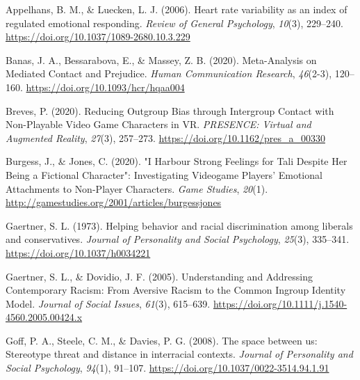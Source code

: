 \documentclass[
  english,
  man, noextraspace,floatsintext]{apa6}
\newlength{\cslhangindent}
\newlength{\cslentryspacingunit} %
\newenvironment{CSLReferences}[2] %
 {%
  \setlength{\parindent}{0pt}
  \ifodd #1
  \let\oldpar\par
  \def\par{\hangindent=\cslhangindent\oldpar}
  \fi
  \setlength{\parskip}{#2\cslentryspacingunit}
 }%
 {}
\begin{document}
\hypertarget{refs}{}
\begin{CSLReferences}{1}{0}
\leavevmode{}%
Appelhans, B. M., \& Luecken, L. J. (2006). Heart rate variability as an index of regulated emotional responding. \emph{Review of General Psychology}, \emph{10}(3), 229--240. \url{https://doi.org/10.1037/1089-2680.10.3.229}

\leavevmode{}%
Banas, J. A., Bessarabova, E., \& Massey, Z. B. (2020). Meta-{Analysis} on {Mediated Contact} and {Prejudice}. \emph{Human Communication Research}, \emph{46}(2-3), 120--160. \url{https://doi.org/10.1093/hcr/hqaa004}

\leavevmode{}%
Breves, P. (2020). Reducing {Outgroup Bias} through {Intergroup Contact} with {Non}-{Playable Video Game Characters} in {VR}. \emph{PRESENCE: Virtual and Augmented Reality}, \emph{27}(3), 257--273. \url{https://doi.org/10.1162/pres_a_00330}

\leavevmode{}%
Burgess, J., \& Jones, C. (2020). {"}{I Harbour Strong Feelings} for {Tali Despite Her Being} a {Fictional Character}{"}: {Investigating Videogame Players}' {Emotional Attachments} to {Non}-{Player Characters}. \emph{Game Studies}, \emph{20}(1). \url{http://gamestudies.org/2001/articles/burgessjones}

\leavevmode{}%
Gaertner, S. L. (1973). Helping behavior and racial discrimination among liberals and conservatives. \emph{Journal of Personality and Social Psychology}, \emph{25}(3), 335--341. \url{https://doi.org/10.1037/h0034221}

\leavevmode{}%
Gaertner, S. L., \& Dovidio, J. F. (2005). Understanding and {Addressing Contemporary Racism}: {From Aversive Racism} to the {Common Ingroup Identity Model}. \emph{Journal of Social Issues}, \emph{61}(3), 615--639. \url{https://doi.org/10.1111/j.1540-4560.2005.00424.x}

\leavevmode{}%
Goff, P. A., Steele, C. M., \& Davies, P. G. (2008). The space between us: {Stereotype} threat and distance in interracial contexts. \emph{Journal of Personality and Social Psychology}, \emph{94}(1), 91--107. \url{https://doi.org/10.1037/0022-3514.94.1.91}


\end{CSLReferences}
\end{document}
